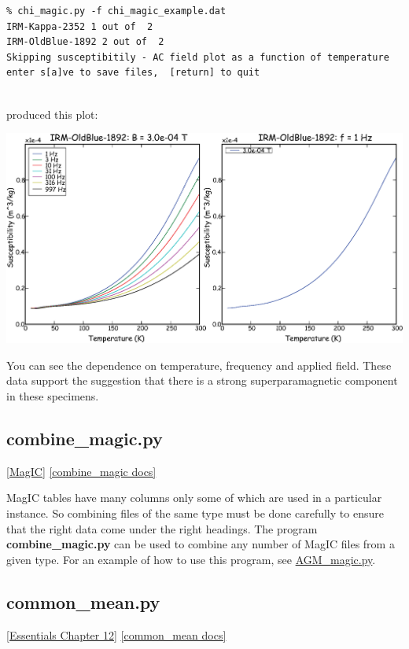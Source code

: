 \documentclass[11pt]{book}
\begin{document}
{{{\begin{verbatim}
% chi_magic.py -f chi_magic_example.dat
IRM-Kappa-2352 1 out of  2
IRM-OldBlue-1892 2 out of  2
Skipping susceptibitily - AC field plot as a function of temperature
enter s[a]ve to save files,  [return] to quit 


\end{verbatim}

\noindent produced this plot: 


  \includegraphics[width=15cm]{EPSfiles/chi-magic.eps}

You can see the dependence on temperature, frequency and applied field.  These data support the suggestion that there is a strong superparamagnetic component in these specimens.   

\subsection {combine\_magic.py} \href{#MagIC}{[MagIC]}
\label{ex:combine_magic}
\href{http://earthref.org/PmagPy/pmagpydocs/combine_magic-module.html}{[combine\_magic docs]}

MagIC tables have many columns only some of which are used in a particular instance.  So combining files of the same type must be done carefully to ensure that the right data come under the right headings.  The program {\bf combine\_magic.py} can be used to combine any number of MagIC files from a given type.    For an example of how to use this program, see \href{#AGM_magic.py}{AGM\_magic.py}. 



\subsection{common\_mean.py} 
\href{http://magician.ucsd.edu/Essentials_2/WebBook2ch12.html#ch12}{[Essentials Chapter 12]}
\href{http://earthref.org/PmagPy/pmagpydocs/common_mean-module.html}{[common\_mean docs]}

}}}
\end{document}
